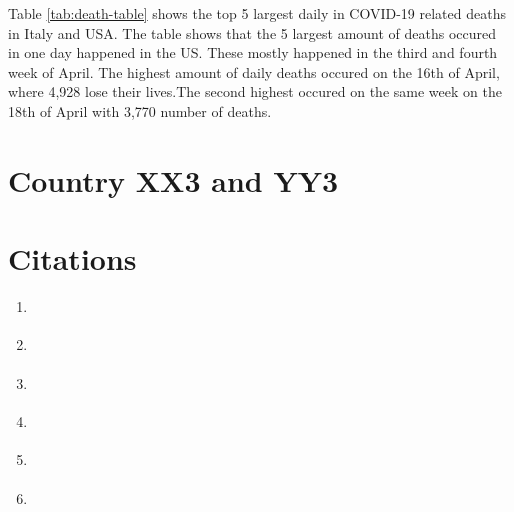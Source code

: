 \documentclass[11pt,a4paper,]{article}
\providecommand{\tightlist}{%
  \setlength{\itemsep}{0pt}\setlength{\parskip}{0pt}}
\begin{document}
Table \ref{tab:death-table} shows the top 5 largest daily in COVID-19 related deaths in Italy and USA. The table shows that the 5 largest amount of deaths occured in one day happened in the US. These mostly happened in the third and fourth week of April. The highest amount of daily deaths occured on the 16th of April, where 4,928 lose their lives.The second highest occured on the same week on the 18th of April with 3,770 number of deaths.

\section*{Country XX3 and YY3}

\clearpage

\hypertarget{citations}{%
\section{Citations}\label{citations}}

\begin{enumerate}
\def\labelenumi{\arabic{enumi}.}
\tightlist
\item
  \textcite{tidyverse}
\item
  \textcite{readr}
\item
  \textcite{KableExtra}
\item
  \textcite{bookdown}
\item
  \textcite{bookdown2}
\item
  \textcite{lubridate}
\end{enumerate}

\clearpage

\printbibliography
\end{document}
